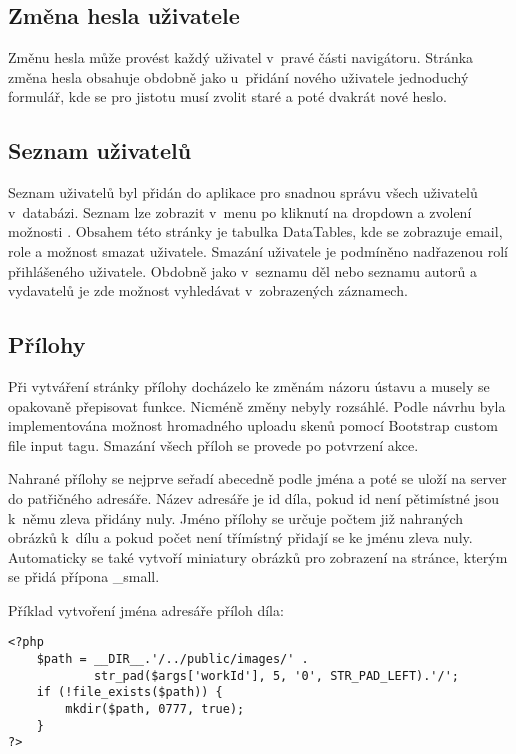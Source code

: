         \subsection{Změna hesla uživatele}
            Změnu hesla může provést každý uživatel v~pravé části navigátoru. Stránka změna hesla obsahuje obdobně jako u~přidání nového uživatele jednoduchý formulář, kde se pro jistotu musí zvolit staré a poté dvakrát nové heslo.
            
        \subsection{Seznam uživatelů}
            Seznam uživatelů byl přidán do aplikace pro snadnou správu všech uživatelů v~databázi. Seznam lze zobrazit v~menu po kliknutí na dropdown a zvolení možnosti . Obsahem této stránky je tabulka DataTables, kde se zobrazuje email, role a možnost smazat uživatele. Smazání uživatele je podmíněno nadřazenou rolí přihlášeného uživatele. Obdobně jako v~seznamu děl nebo seznamu autorů a vydavatelů je zde možnost vyhledávat v~zobrazených záznamech.
        
        \subsection{Přílohy}
            Při vytváření stránky přílohy docházelo ke změnám názoru ústavu a musely se opakovaně přepisovat funkce. Nicméně změny nebyly rozsáhlé. Podle návrhu byla implementována možnost hromadného uploadu skenů pomocí Bootstrap custom file input tagu. Smazání všech příloh se provede po potvrzení akce.
            
            Nahrané přílohy se nejprve seřadí abecedně podle jména a poté se uloží na server do patřičného adresáře. Název adresáře je id díla, pokud id není pětimístné jsou k~němu zleva přidány nuly. Jméno přílohy se určuje počtem již nahraných obrázků k~dílu a pokud počet není třímístný přidají se ke jménu zleva nuly. Automaticky se také vytvoří miniatury obrázků pro zobrazení na stránce, kterým se přidá přípona \_small.
            
            Příklad vytvoření jména adresáře příloh díla:
            \pagebreak
            \begin{verbatim}
<?php
    $path = __DIR__.'/../public/images/' .
            str_pad($args['workId'], 5, '0', STR_PAD_LEFT).'/';
    if (!file_exists($path)) {
        mkdir($path, 0777, true);
    }
?>
            \end{verbatim}
            
